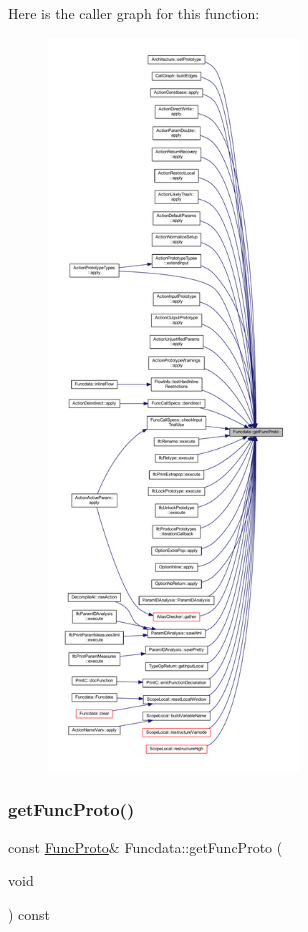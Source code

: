 Here is the caller graph for this function\+:
\nopagebreak
\begin{figure}[H]
\begin{center}
\leavevmode
\includegraphics[height=550pt]{class_funcdata_a1b1961c6d9c58e9a0a20f74c6e49853f_icgraph}
\end{center}
\end{figure}
\mbox{\label{class_funcdata_af99d6aeaee949a45ec935756a93b99da}} 
\subsubsection{\texorpdfstring{getFuncProto()}{getFuncProto()}\hspace{0.1cm}{\footnotesize\ttfamily [2/2]}}
{\footnotesize\ttfamily const \mbox{\hyperlink{class_func_proto}{Func\+Proto}}\& Funcdata\+::get\+Func\+Proto (\begin{DoxyParamCaption}\item[{void}]{ }\end{DoxyParamCaption}) const\hspace{0.3cm}{\ttfamily [inline]}}



